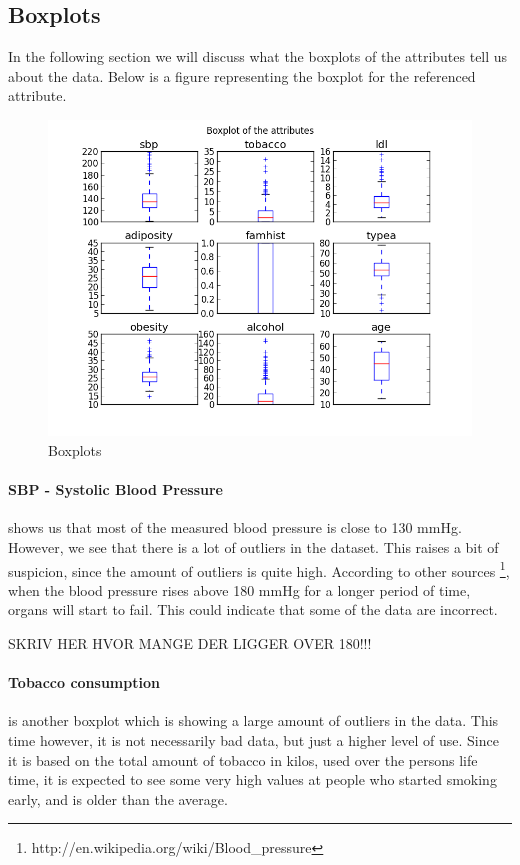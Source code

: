 \subsection{Boxplots}
In the following section we will discuss what the boxplots of the attributes tell us about the data.
Below is a figure representing the boxplot for the referenced attribute.
\begin{figure}[H]
\centering
\includegraphics[width=12cm, keepaspectratio=true]{pictures/boxplot.png}
\caption{\footnotesize Boxplots}
\label{boxplot}
\end{figure}
\paragraph{SBP - Systolic Blood Pressure} shows us that most of the measured blood pressure is close to 130 mmHg. However, we see that there is a lot of outliers in the dataset. This raises a bit of suspicion, since the amount of outliers is quite high. According to other sources \footnote{http://en.wikipedia.org/wiki/Blood\_pressure}, when the blood pressure rises above 180 mmHg for a longer period of time, organs will start to fail. This could indicate that some of the data are incorrect.

SKRIV HER HVOR MANGE DER LIGGER OVER 180!!!

\paragraph{Tobacco consumption} is another boxplot which is showing a large amount of outliers in the data. This time however, it is not necessarily bad data, but just a higher level of use. Since it is based on the total amount of tobacco in kilos, used over the persons life time, it is expected to see some very high values at people who started smoking early, and is older than the average.

